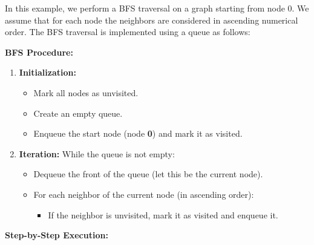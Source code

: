 \documentclass[11pt]{article}
\begin{document}
In this example, we perform a BFS traversal on a graph starting from node 0. We assume that for each node the neighbors are considered in ascending numerical order. The BFS traversal is implemented using a queue as follows:



\textbf{BFS Procedure:}
\begin{enumerate}[label=\arabic*.]
    \item \textbf{Initialization:}
          \begin{itemize}
              \item Mark all nodes as unvisited.
              \item Create an empty queue.
              \item Enqueue the start node (node \textbf{0}) and mark it as visited.
          \end{itemize}
    \item \textbf{Iteration:} While the queue is not empty:
          \begin{itemize}
              \item Dequeue the front of the queue (let this be the current node).
              \item For each neighbor of the current node (in ascending order):
                    \begin{itemize}
                        \item If the neighbor is unvisited, mark it as visited and enqueue it.
                    \end{itemize}
          \end{itemize}
\end{enumerate}



\textbf{Step-by-Step Execution:}
\end{document}
